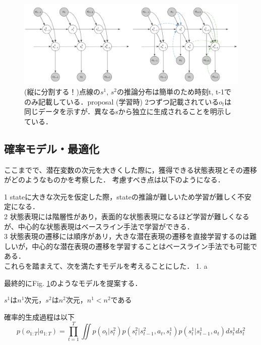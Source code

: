 \begin{figure}[tbp]
  \begin{center}
    \includegraphics[width=\linewidth]{./figures/proposal.png}
    \caption{(縦に分割する！)点線の$s^1$, $s^2$の推論分布は簡単のため時刻t, t-1でのみ記載している．proposal (学習時) 2つずつ記載されている$o_t$は同じデータを示すが．異なるsから独立に生成されることを明示している．}
    \label{fig:proposal}
  \end{center}
\end{figure}


\subsection{確率モデル・最適化}

ここまでで、潜在変数の次元を大きくした際に，獲得できる状態表現とその遷移がどのようなものかを考察した．
考慮すべき点は以下のようになる．

1 stateに大きな次元を仮定した際，stateの推論が難しいため学習が難しく不安定になる． \\
2 状態表現には階層性があり，表面的な状態表現になるほど学習が難しくなるが、中心的な状態表現はベースライン手法で学習ができる． \\
3 状態表現の遷移には順序があリ，大きな潜在表現の遷移を直接学習するのは難しいが，中心的な潜在表現の遷移を学習することはベースライン手法でも可能である． \\

これらを踏まえて、次を満たすモデルを考えることにした．
1. a


最終的にFig. \ref{fig:proposal}のようなモデルを提案する．

$s^1$は$n^1$次元，$s^2$は$n^2$次元，$n^1 < n^2$である

確率的生成過程は以下
\begin{equation}
  p(o_{1:T}|a_{1:T}) = \prod_{t=1}^T \iint p(o_t|s^2_t) p(s^2_t|s^2_{t-1}, a_t, s^1_t) p(s^1_t|s^1_{t-1}, a_t) d{s^1_t}{ds^2_t}
\end{equation}


